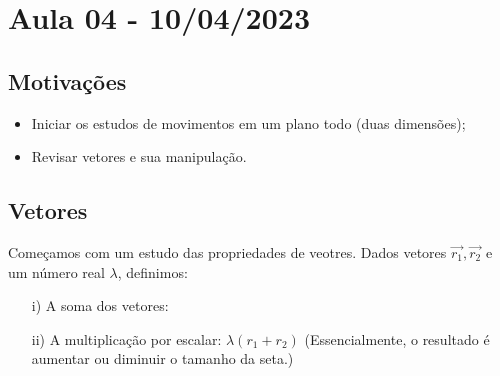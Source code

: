 \documentclass[physics_notes.tex]{subfiles}
\begin{document}
\section{Aula 04 - 10/04/2023}
\subsection{Motivações}
\begin{itemize}
	\item Iniciar os estudos de movimentos em um plano todo (duas dimensões);
	\item Revisar vetores e sua manipulação.
\end{itemize}

\subsection{Vetores}
Começamos com um estudo das propriedades de veotres. Dados vetores $\vec{r_{1}}, \vec{r_{2}}$ e um número real $\lambda$, definimos:
\begin{itemize}
	\item[i)] A soma dos vetores:
	      \begin{center}
	      \end{center}
	\item[ii)] A multiplicação por escalar: $\lambda(r_{1}+r_{2})$ (Essencialmente, o resultado é aumentar ou diminuir o tamanho da seta.)
	      \begin{center}
	      \end{center}
\end{itemize}
\end{document}
